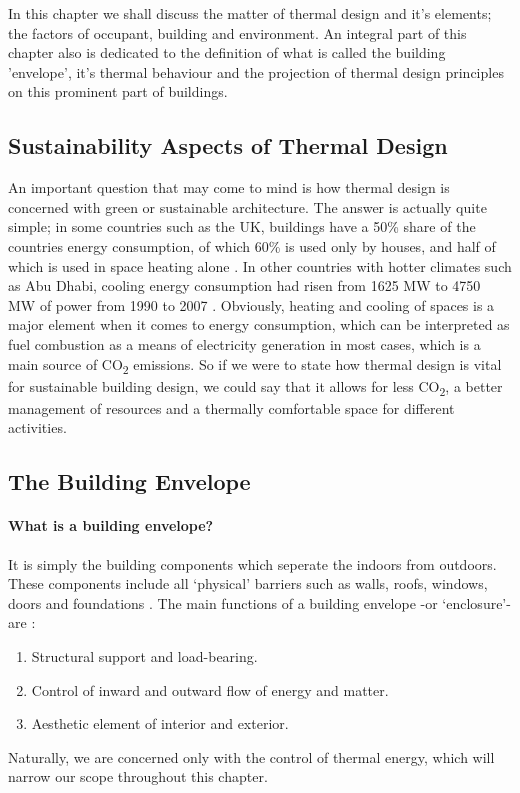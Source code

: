 \documentclass[a4paper,twoside,12pt,openright,final,oldfontcommands]{memoir}
\begin{document}
In this chapter we shall discuss the matter of thermal design and it's elements; the
factors of occupant, building and environment. An integral part of this
chapter also is dedicated to the definition of what is called the building 'envelope', it's thermal
behaviour and the projection of thermal design principles on this prominent part of buildings.

\subsection{Sustainability Aspects of Thermal Design}
An important question that may come to mind is how thermal design is concerned with green or
sustainable architecture. The answer is actually quite simple; in some countries such as the UK,
buildings have a 50\% share of the countries energy consumption, of which 60\% is used only by
houses, and half of which is used in space heating alone \cite{edwards96}. In other countries with
hotter climates such as Abu Dhabi, cooling energy consumption had risen from 1625 MW to 4750 MW of
power from 1990 to 2007 \cite{nauman07}. Obviously, heating and cooling of spaces is a major
element when it comes to energy consumption, which can be interpreted as fuel combustion as a means
of electricity generation in most cases, which is a main source of CO\textsubscript{2} emissions. So
if we were to state how thermal design is vital for sustainable building design, we could say that it allows
for less CO\textsubscript{2}, a better management of resources and a thermally comfortable space
for different activities.

\subsection{The Building Envelope}
\paragraph{What is a building envelope?}It is simply the building components which
seperate the indoors from outdoors. These components include all `physical' barriers such as walls, roofs,
windows, doors and foundations \cite{HPO}. The main functions of a building envelope -or
`enclosure'- are \cite{straube05}:
\begin{enumerate}
  \item Structural support and load-bearing.
  \item Control of inward and outward flow of energy and matter.
  \item Aesthetic element of interior and exterior.
\end{enumerate}
Naturally, we are concerned only with the control of thermal energy, which will narrow our scope
throughout this chapter.
\end{document}
